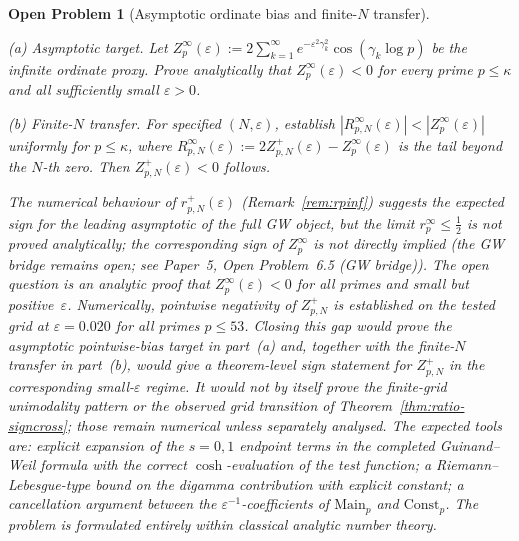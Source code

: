 \documentclass[11pt]{article}
\newtheorem{openproblem}[theorem]{Open Problem}
\begin{document}
\begin{openproblem}[Asymptotic ordinate bias and finite-$N$ transfer]\label{op:bias}
\label{op:bias-asymp}

\emph{(a) Asymptotic target.}
Let $Z_p^{\infty}(\varepsilon):=
2\sum_{k=1}^{\infty}e^{-\varepsilon^2\gamma_k^2}\cos(\gamma_k\log p)$
be the infinite ordinate proxy. Prove analytically that
$Z_p^{\infty}(\varepsilon)<0$ for every prime $p\le\kappa$ and all
sufficiently small $\varepsilon>0$.

\emph{(b) Finite-$N$ transfer.}
For specified $(N,\varepsilon)$, establish
$|R_{p,N}^{\infty}(\varepsilon)|<|Z_p^{\infty}(\varepsilon)|$
uniformly for $p\le\kappa$, where
$R_{p,N}^{\infty}(\varepsilon):=2Z_{p,N}^+(\varepsilon)-Z_p^{\infty}(\varepsilon)$
is the tail beyond the $N$-th zero. Then $Z_{p,N}^+(\varepsilon)<0$ follows.

The numerical behaviour of $r^+_{p,N}(\varepsilon)$
(Remark~\ref{rem:rpinf})
suggests the expected sign for the leading asymptotic of the full GW object,
but the limit $r_p^{\infty}\le\tfrac12$ is not proved analytically;
the corresponding sign of $Z_p^{\infty}$ is not directly
implied (the GW bridge remains open; see Paper~5, Open Problem~6.5 (GW bridge)).
The open question is an analytic proof that $Z_p^{\infty}(\varepsilon)<0$
for all primes and small but positive~$\varepsilon$.
Numerically, pointwise negativity of $Z_{p,N}^+$ is established on the
tested grid at $\varepsilon=0.020$ for all primes $p\le 53$.
Closing this gap would prove the asymptotic pointwise-bias target in
part~(a) and, together with the finite-$N$ transfer in part~(b),
would give a theorem-level sign statement for $Z_{p,N}^+$ in the
corresponding small-$\varepsilon$ regime.
It would \emph{not} by itself prove the finite-grid unimodality
pattern or the observed grid transition of
Theorem~\ref{thm:ratio-signcross}; those remain numerical unless
separately analysed.
The expected tools are: explicit expansion of the $s=0,1$ endpoint
terms in the completed Guinand--Weil formula with the correct
$\cosh$-evaluation of the test function; a Riemann--Lebesgue-type bound on the digamma contribution
with explicit constant; a cancellation argument between the
$\varepsilon^{-1}$-coefficients of $\mathrm{Main}_p$ and
$\mathrm{Const}_p$.
The problem is formulated entirely within classical analytic number theory.
\end{openproblem}
\end{document}
